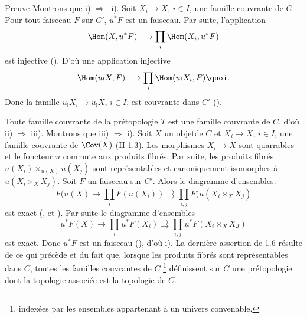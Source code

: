 \documentclass[10pt]{../fichiers-configuration-latex/smfart}
\begin{document}
\begin{enonce*}[remark]{Preuve}
Montrons que i) $\Rightarrow$ ii). Soit $X_i\rightarrow X$, $i\in
I$, une famille couvrante de $C$. Pour tout faisceau $F$ sur $C'$,
$u^\ast F$ est un faisceau. Par suite, l'application
$$
\Hom(X,u^\ast F)\longrightarrow \prod_i\Hom(X_i,u^\ast F)
$$
est injective (). D'où une application injective
$$
\Hom(u_{!}X,F)\longrightarrow \prod_i \Hom(u_{!}X_i, F){\quoi}.
$$
Donc la famille $u_{!}X_i\rightarrow u_{!}X$, $i\in I$, est
couvrante dans $C'$ ().

Toute famille couvrante de la prétopologie $T$ est une famille
couvrante de $C$, d'où ii) $\Rightarrow$ iii). Montrons que iii)
$\Rightarrow$ i). Soit $X$ un objet\pageoriginale de $C$ et
$X_i\rightarrow X$, $i\in I$, une famille couvrante de $\Cov(X)$ (II
1.3). Les morphismes $X_i\rightarrow X$ sont quarrables et le
foncteur $u$ commute aux produits fibrés. Par suite, les
produits fibrés $u(X_i)\times_{u(X)} u(X_j)$ sont
représentables et canoniquement isomorphes à $u(X_i\times_X
X_j)$. Soit $F$ un faisceau sur $C'$. Alors le diagramme
d'ensembles:
$$
F(u(X)\rightarrow \prod_i F(u(X_i))\rightrightarrows
\prod_{i,j}F(u(X_i\times_X X_j)
$$
est exact (,  et ). Par
suite le diagramme d'ensembles
$$
u^\ast F(X)\rightarrow \prod_i u^\ast F(X_i)\rightrightarrows
\prod_{i,j}u^\ast F(X_i\times_X X_J)
$$
est exact. Donc $u^\ast F$ est un faisceau (), d'où
i). La dernière assertion de \hyperref[III.prop1.6]{1.6} résulte de ce
qui précède et du fait que, lorsque les produits fibrés
sont représentables dans $C$, toutes les familles couvrantes de
$C$ \footnote[1]{indexées par les
  ensembles appartenant à un univers convenable.} définissent sur
$C$ une prétopologie dont la topologie associée est la
topologie de $C$.
\end{enonce*}
\end{document}
